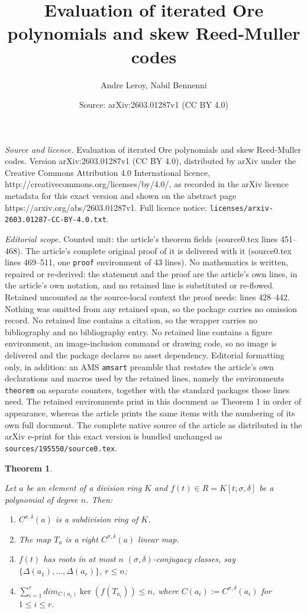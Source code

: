 \documentclass[10pt,a4paper]{amsart}
\title{Evaluation of iterated Ore polynomials and skew Reed-Muller codes}
\author{Andre Leroy, Nabil Bennenni}
\date{Source: arXiv:2603.01287v1 (CC BY 4.0)}
\newtheorem{theorem}{Theorem}
\newcommand{\de}{\delta}
\newcommand{\si}{\sigma}
\begin{document}
\maketitle

\noindent\emph{Source and licence.} Evaluation of iterated Ore polynomials and skew Reed-Muller codes. Version arXiv:2603.01287v1 (CC BY 4.0), distributed by arXiv under the Creative Commons Attribution 4.0 International licence, http://creativecommons.org/licenses/by/4.0/, as recorded in the arXiv licence metadata for this exact version and shown on the abstract page https://arxiv.org/abs/2603.01287v1. Full licence notice: \texttt{licenses/arxiv-2603.01287-CC-BY-4.0.txt}.\par\smallskip

\noindent\textit{Editorial scope.} Counted unit: the article's theorem fields (source0.tex lines 451--468). The article's complete original proof of it is delivered with it (source0.tex lines 469--511, one \texttt{proof} environment of 43 lines). No mathematics is written, repaired or re-derived: the statement and the proof are the article's own lines, in the article's own notation, and no retained line is substituted or re-flowed.  Retained uncounted as the source-local context the proof needs: lines 428--442.  Nothing was omitted from any retained span, so the package carries no omission record.  No retained line contains a citation, so the wrapper carries no bibliography and no bibliography entry.  No retained line contains a figure environment, an image-inclusion command or drawing code, so no image is delivered and the package declares no asset dependency.  Editorial formatting only, in addition: an AMS \texttt{amsart} preamble that restates the article's own declarations and macros used by the retained lines, namely the environments \texttt{theorem} on separate counters, together with the standard packages those lines need.  The retained environments print in this document as Theorem 1 in order of appearance, whereas the article prints the same items with the numbering of its own full document.  The complete native source of the article as distributed in the arXiv e-print for this exact version is bundled unchanged as \texttt{sources/195550/source0.tex}.
\begin{theorem}
	\label{generalization of Gordon-Motzkin}
	
	Let $a$ be an element of a division ring $K$ and $f(t)\in R=K[t;\sigma,\delta]$ be a polynomial of degree $n$.
	Then:
	\begin{enumerate}
		\item[(1)] $C^{\si,\de}(a)$ is a subdivision ring of $K$.
		\item[(2)] The map $T_a$ is a right $C^{\si,\de}(a)$ linear map.
		\item[(3)] $f(t)$ has roots in at most $n$ $(\sigma,
		\delta)$-conjugacy classes, say $\{\Delta
		(a_1),\dots,\Delta(a_r)\}$, $r\le n$;
		\item[(4)] $\sum_{i=1}^rdim_{C(a_i)}\ker (f(T_{a_i}))\le n$, where 
		$C(a_i):=C^{\si,\de}(a_i)$ for $1\le i \le r$.
	\end{enumerate}
\end{theorem}
\end{document}
